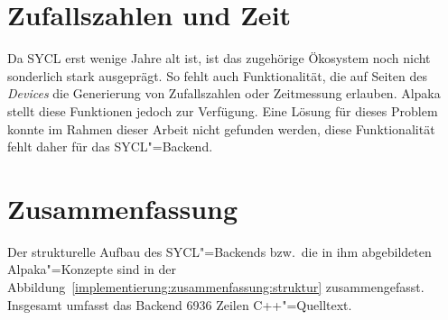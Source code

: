\section{Zufallszahlen und Zeit}

Da SYCL erst wenige Jahre alt ist, ist das zugehörige Ökosystem noch nicht
sonderlich stark ausgeprägt. So fehlt auch Funktionalität, die auf Seiten des
\textit{Devices} die Generierung von Zufallszahlen oder Zeitmessung erlauben.
Alpaka stellt diese Funktionen jedoch zur Verfügung. Eine Lösung für dieses
Problem konnte im Rahmen dieser Arbeit nicht gefunden werden, diese
Funktionalität fehlt daher für das SYCL"=Backend.

\section{Zusammenfassung}

Der strukturelle Aufbau des SYCL"=Backends bzw.\ die in ihm abgebildeten
Alpaka"=Konzepte sind in der
Abbildung~\ref{implementierung:zusammenfassung:struktur} zusammengefasst.
Insgesamt umfasst das Backend \num{6936} Zeilen C++"=Quelltext.

